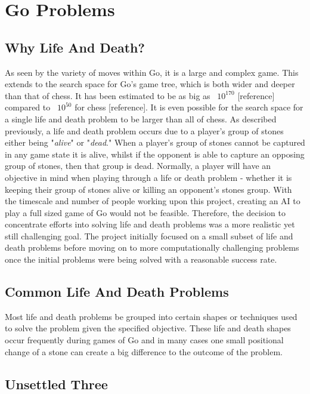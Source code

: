 \documentclass{l3proj}
\begin{document}
\section{Go Problems}

\subsection{Why Life And Death?}

As seen by the variety of moves within Go, it is a large and complex game. This extends to the search space for Go's game tree, which is both wider and deeper than that of chess. It has been estimated to be as big as ~$10^{170}$ [reference] compared to ~$10^{50}$ for chess [reference]. It is even possible for the search space for a single life and death problem to be larger than all of chess. As described previously, a life and death problem occurs due to a player's group of stones either being "\textit{alive}" or "\textit{dead}." When a player's group of stones cannot be captured in any game state it is alive, whilst if the opponent is able to capture an opposing group of stones, then that group is dead. Normally, a player will have an objective in mind when playing through a life or death problem - whether it is keeping their group of stones alive or killing an opponent's stones group. With the timescale and number of people working upon this project, creating an AI to play a full sized game of Go would not be feasible. Therefore, the decision to concentrate efforts into solving life and death problems was a more realistic yet still challenging goal. The project initially focused on a small subset of life and death problems before moving on to more computationally challenging problems once the initial problems were being solved with a reasonable success rate.

\subsection{Common Life And Death Problems}

Most life and death problems be grouped into certain shapes or techniques used to solve the problem given the specified objective. These life and death shapes occur frequently during games of Go and in many cases one small positional change of a stone can create a big difference to the outcome of the problem.

\subsection{Unsettled Three}
\end{document}
